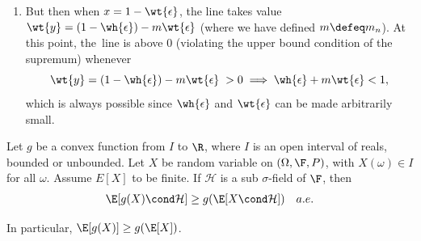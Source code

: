 \documentclass{article} %
\begin{document}
\begin{remark}
\begin{enumerate}
\item But then when $x = 1 - \wt{\epsilon}$, the line takes value $\wt{y} = (1 - \wh{\epsilon}) - m \wt{\epsilon}$ (where we have defined $m \defeq m_n$).  At this point, the\ line is above 0 (violating the upper bound condition of the supremum) whenever 
\[ \wt{y} = (1 - \wh{\epsilon}) - m \wt{\epsilon} \; > 0 \implies \wh{\epsilon} + m \wt{\epsilon} < 1,\]
which is always possible since $\wh{\epsilon}$ and $\wt{\epsilon}$ can be made arbitrarily small.   
\end{enumerate}

\end{remark}


\begin{theorem}
Let $g$ be a convex function from $I$ to $\R$, where $I$ is an open interval of reals, bounded or unbounded.  Let $X$ be random variable on $(\Omega, \F, P)$, with $X(\omega) \in I$ for all $\omega$.  Assume $E[X]$ to be finite. If $\mathcal{H}$ is a sub $\sigma$-field of $\F$, then 
%
\begin{align}
\E[g(X) \cond \mathcal{H}] \geq g(\E[X \cond \mathcal{H}]) \quad a.e. 
\label{eqn:jensens_inequality_for_conditional_expectations}	
\end{align}  

In particular, $\E[g(X)] \geq g(\E[X])$.
\label{thm:jensens_inequality}	
\end{theorem}
\end{document}

